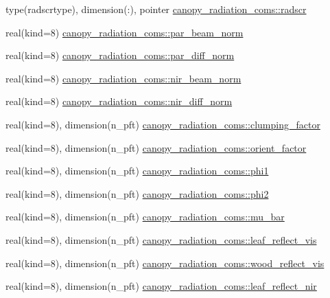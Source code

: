 \begin{DoxyCompactItemize}
\item 
type(radscrtype), dimension(\+:), pointer \hyperlink{namespacecanopy__radiation__coms_a77faeb46000116eff7d27da31a4ddfde}{canopy\+\_\+radiation\+\_\+coms\+::radscr}
\item 
real(kind=8) \hyperlink{namespacecanopy__radiation__coms_a0a87e7dadcbbc1c05d9cfb08a7607c0d}{canopy\+\_\+radiation\+\_\+coms\+::par\+\_\+beam\+\_\+norm}
\item 
real(kind=8) \hyperlink{namespacecanopy__radiation__coms_ab53bf5914c4dc3aa86dd2160e68069ba}{canopy\+\_\+radiation\+\_\+coms\+::par\+\_\+diff\+\_\+norm}
\item 
real(kind=8) \hyperlink{namespacecanopy__radiation__coms_a9387757f090749999584c88841b2d58d}{canopy\+\_\+radiation\+\_\+coms\+::nir\+\_\+beam\+\_\+norm}
\item 
real(kind=8) \hyperlink{namespacecanopy__radiation__coms_a0f8a87e695122729f76ac2044ee7dec7}{canopy\+\_\+radiation\+\_\+coms\+::nir\+\_\+diff\+\_\+norm}
\item 
real(kind=8), dimension(n\+\_\+pft) \hyperlink{namespacecanopy__radiation__coms_a2fa961375137b621f360e2de7d57a2a9}{canopy\+\_\+radiation\+\_\+coms\+::clumping\+\_\+factor}
\item 
real(kind=8), dimension(n\+\_\+pft) \hyperlink{namespacecanopy__radiation__coms_a15026d6621180461dc537b2a9ea8e012}{canopy\+\_\+radiation\+\_\+coms\+::orient\+\_\+factor}
\item 
real(kind=8), dimension(n\+\_\+pft) \hyperlink{namespacecanopy__radiation__coms_a03002619fd623b8e11ded7e257d4579f}{canopy\+\_\+radiation\+\_\+coms\+::phi1}
\item 
real(kind=8), dimension(n\+\_\+pft) \hyperlink{namespacecanopy__radiation__coms_a84f81efa08280199991186a9f501c053}{canopy\+\_\+radiation\+\_\+coms\+::phi2}
\item 
real(kind=8), dimension(n\+\_\+pft) \hyperlink{namespacecanopy__radiation__coms_ad267188bb42ff06c3f69554fbe4c595e}{canopy\+\_\+radiation\+\_\+coms\+::mu\+\_\+bar}
\item 
real(kind=8), dimension(n\+\_\+pft) \hyperlink{namespacecanopy__radiation__coms_a155b16acb09a1de77430d943c332d850}{canopy\+\_\+radiation\+\_\+coms\+::leaf\+\_\+reflect\+\_\+vis}
\item 
real(kind=8), dimension(n\+\_\+pft) \hyperlink{namespacecanopy__radiation__coms_ae24039da794ebfb5ff7eb9db190a9a1e}{canopy\+\_\+radiation\+\_\+coms\+::wood\+\_\+reflect\+\_\+vis}
\item 
real(kind=8), dimension(n\+\_\+pft) \hyperlink{namespacecanopy__radiation__coms_a4e4cdd2fcb0cf93d9c9521bde9362a30}{canopy\+\_\+radiation\+\_\+coms\+::leaf\+\_\+reflect\+\_\+nir}

\end{DoxyCompactItemize}
